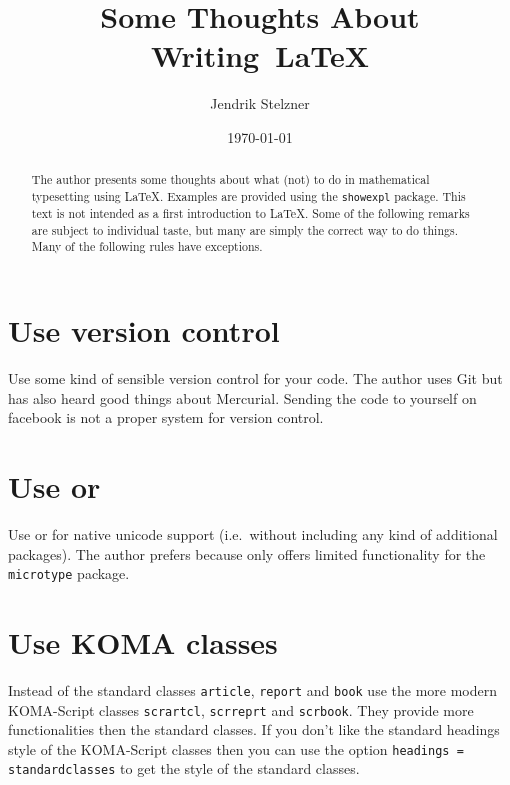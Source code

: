 \documentclass[a4paper, 10pt, abstract=on, headings=standardclasses]{scrartcl}
\title{Some Thoughts About Writing~\LaTeX}
\author{Jendrik Stelzner}
\date{\today}
\begin{document}
\maketitle

\begin{abstract}
  The author presents some thoughts about what (not) to do in mathematical typesetting using \LaTeX.
  Examples are provided using the \texttt{showexpl} package.
  This text is not intended as a first introduction to \LaTeX.
  Some of the following remarks are subject to individual taste, but many are simply the correct way to do things.
  Many of the following rules have exceptions.
\end{abstract}

\tableofcontents





\section{Use version control}

Use some kind of sensible version control for your code.
The author uses Git but has also heard good things about Mercurial.
Sending the code to yourself on facebook is not a proper system for version control.





\section{Use  or }

Use  or  for native unicode support (i.e.\ without including any kind of additional packages).
The author prefers  because  only offers limited functionality for the \texttt{microtype} package.





\section{Use KOMA classes}

Instead of the standard classes \texttt{article}, \texttt{report} and \texttt{book} use the more modern KOMA-Script classes \texttt{scrartcl}, \texttt{scrreprt} and \texttt{scrbook}.
They provide more functionalities then the standard classes.
If you don’t like the standard headings style of the KOMA-Script classes then you can use the option \texttt{headings = standardclasses} to get the style of the standard classes.
\end{document}
